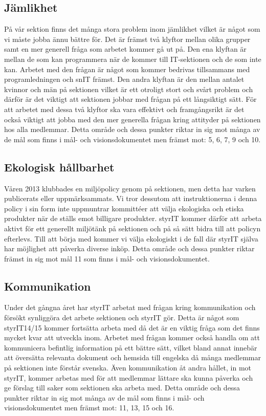 \documentclass[11pt, includeaddress]{../../classes/cthit}
\begin{document}
\subsection{Jämlikhet}
På vår sektion finns det många stora problem inom jämlikhet vilket är något som vi måste jobba ännu bättre för. Det är främst två klyftor mellan olika grupper samt en mer generell fråga som arbetet kommer gå ut på. Den ena klyftan är mellan de som kan programmera när de kommer till IT-sektionen och de som inte kan. Arbetet med den frågan är något som kommer bedrivas tillsammans med programledningen och snIT främst. Den andra klyftan är den mellan antalet kvinnor och män på sektionen vilket är ett otroligt stort och svårt problem och därför är det viktigt att sektionen jobbar med frågan på ett långsiktigt sätt. För att arbetet med dessa två klyftor ska vara effektivt och framgångsrikt är det också viktigt att jobba med den mer generella frågan kring attityder på sektionen hos alla medlemmar.
\newline
\newline
Detta område och dessa punkter riktar in sig mot många av de mål som finns i mål- och visionsdokumentet men främst mot: 5, 6, 7, 9 och 10.

\subsection{Ekologisk hållbarhet}
Våren 2013 klubbades en miljöpolicy genom på sektionen, men detta har varken publicerats eller uppmärksammats. Vi tror dessutom att instruktionerna i denna policy i sin form inte uppmuntrar kommittéer att välja ekologiska och etiska produkter när de ställs emot billigare produkter. styrIT kommer därför att arbeta aktivt för ett generellt miljötänk på sektionen och på så sätt bidra till att policyn efterlevs. Till att börja med kommer vi välja ekologiskt i de fall där styrIT själva har möjlighet att påverka diverse inköp.
\newline
\newline
Detta område och dessa punkter riktar främst in sig mot mål 11 som finns i mål- och visionsdokumentet.

\subsection{Kommunikation}
Under det gångna året har styrIT arbetat med frågan kring kommunikation och försökt synliggöra det arbete sektionen och styrIT gör. Detta är något som styrIT14/15 kommer fortsätta arbeta med då det är en viktig fråga som det finns mycket kvar att utveckla inom. Arbetet med frågan kommer också handla om att kommunicera befintlig information på ett bättre sätt, vilket bland annat innebär att översätta relevanta dokument och hemsida till engelska då många medlemmar på sektionen inte förstår svenska. Även kommunikation åt andra hållet, in mot styrIT, kommer arbetas med för att medlemmar lättare ska kunna påverka och ge förslag till saker som sektionen ska arbeta med.
\newline
\newline
Detta område och dessa punkter riktar in sig mot många av de mål som finns i mål- och visionsdokumentet men främst mot: 11, 13, 15 och 16.
\end{document}
